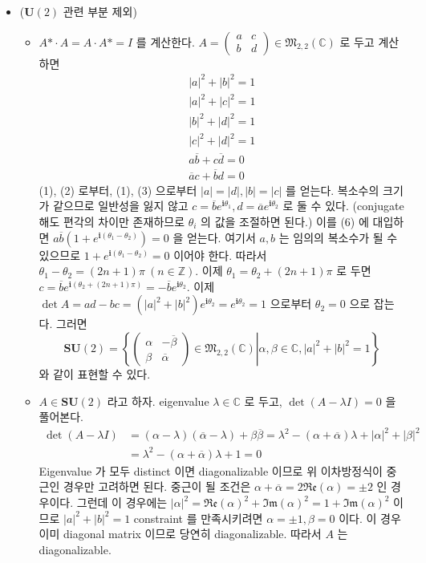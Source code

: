 \documentclass[12pt]{report}
\newcommand{\numl}[1]{\item[\large\textbf{#1}]}
\newcommand{\num}[1]{\item[\textbf{#1}]}
\newcommand{\mf}[1]{\mathfrak{#1}}
\newcommand{\mbb}[1]{\mathbb{#1}}
\newcommand{\rmbf}[1]{\mathrm{\mathbf{#1}}}
\newcommand{\aster}{\text{*}}
\begin{document}
\begin{itemize}
\numl{10.6.14} ($\rmbf{U}(2)$ 관련 부분 제외)
	\begin{itemize}
		\num{(가)} $A\aster\cdot A = A \cdot A\aster = I$ 를 계산한다. $A = \left(\begin{array}{cc} a & c \\ b & d \end{array}\right) \in \mf{M}_{2, 2}(\mbb{C})$ 로 두고 계산하면 \begin{align}\left|a\right|^2 + \left|b\right|^2 = 1 \\ \left|a\right|^2 + \left|c\right|^2 = 1 \\ \left|b\right|^2 + \left|d\right|^2 = 1 \\ \left|c\right|^2 + \left|d\right|^2 = 1 \\ a\overline{b}+c\overline{d} = 0 \\ \overline{a}c + \overline{b}d = 0\end{align}
		(1), (2) 로부터, (1), (3) 으로부터 $|a|=|d|, |b|=|c|$ 를 얻는다. 복소수의 크기가 같으므로 일반성을 잃지 않고 $c = \overline{b}e^{\rmbf{i}\theta_1}, d = \overline{a}e^{\rmbf{i}\theta_2}$ 로 둘 수 있다. (conjugate 해도 편각의 차이만 존재하므로 $\theta_i$ 의 값을 조절하면 된다.) 이를 (6) 에 대입하면 $a\overline{b}(1+e^{\rmbf{i}(\theta_1-\theta_2)}) = 0$ 을 얻는다. 여기서 $a, b$ 는 임의의 복소수가 될 수 있으므로 $1+e^{\rmbf{i}(\theta_1-\theta_2)} = 0$ 이어야 한다. 따라서 $\theta_1-\theta_2 = (2n+1)\pi \: (n\in \mbb{Z})$. 이제 $\theta_1 = \theta_2 + (2n+1)\pi$ 로 두면 $c = \overline{b}e^{\rmbf{i}(\theta_2 + (2n+1)\pi)} = -\overline{b}e^{\rmbf{i}\theta_2}$. 이제 $\det A = ad-bc =  (|a|^2 + |b|^2)e^{\rmbf{i}\theta_2} = e^{\rmbf{i}\theta_2} = 1$ 으로부터 $\theta_2 = 0$ 으로 잡는다. 그러면 $$\rmbf{SU}(2) = \left\{ \left.\left(\begin{array}{cc} \alpha & -\overline{\beta} \\ \beta & \overline{\alpha} \end{array}\right) \in \mf{M}_{2, 2}(\mbb{C})  \right\rvert \alpha, \beta \in \mbb{C}, \left|a\right|^2 + \left|b\right|^2 = 1\right\}$$ 와 같이 표현할 수 있다.
		\num{(나)} $A\in \rmbf{SU}(2)$ 라고 하자. eigenvalue $\lambda \in\mbb{C}$ 로 두고, $\det(A-\lambda I) = 0$ 을 풀어본다. $$\begin{aligned} \det(A-\lambda I) &= (\alpha - \lambda)(\overline{\alpha} - \lambda) + \beta\overline{\beta} = \lambda^2 - (\alpha + \overline{\alpha})\lambda + |\alpha|^2 + |\beta|^2\\&= \lambda^2 - (\alpha + \overline{\alpha})\lambda + 1 = 0\end{aligned}$$
		Eigenvalue 가 모두 distinct 이면 diagonalizable 이므로 위 이차방정식이 중근인 경우만 고려하면 된다. 중근이 될 조건은 $\alpha + \overline{\alpha} = 2\mf{Re}(\alpha) = \pm 2$ 인 경우이다. 그런데 이 경우에는 $|\alpha|^2 = \mf{Re}(\alpha)^2 + \mf{Im}(\alpha)^2 = 1 + \mf{Im}(\alpha)^2$ 이므로 $\left|a\right|^2 + \left|b\right|^2 = 1$ constraint 를 만족시키려면 $\alpha = \pm 1, \beta = 0$ 이다. 이 경우 이미 diagonal matrix 이므로 당연히 diagonalizable. 따라서 $A$ 는 diagonalizable.
	\end{itemize}


\end{itemize}
\end{document}
